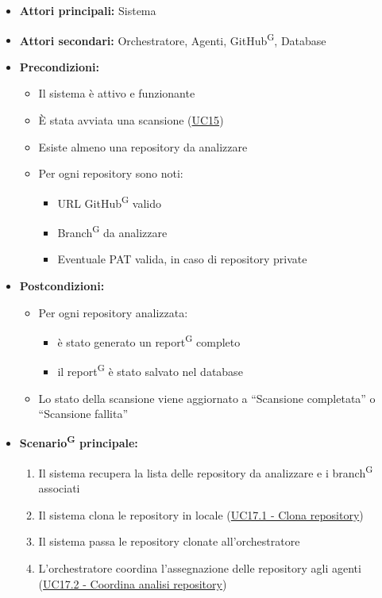 \documentclass[a4paper, 11pt]{article}
\begin{document}
\begin{itemize}
	\item \textbf{Attori principali:} Sistema
	\item \textbf{Attori secondari:} Orchestratore, Agenti, GitHub\textsuperscript{G}, Database
	\item \textbf{Precondizioni:}
	\begin{itemize}
		\item Il sistema è attivo e funzionante
		\item È stata avviata una scansione (\hyperref[UC15]{UC15})
		\item Esiste almeno una repository da analizzare
		\item Per ogni repository sono noti:
		\begin{itemize}
			\item URL GitHub\textsuperscript{G} valido
			\item Branch\textsuperscript{G} da analizzare
			\item Eventuale PAT valida, in caso di repository private
		\end{itemize}
	\end{itemize}
	\item \textbf{Postcondizioni:}
	\begin{itemize}
		\item Per ogni repository analizzata:
		\begin{itemize}
			\item è stato generato un report\textsuperscript{G} completo
			\item il report\textsuperscript{G} è stato salvato nel database
		\end{itemize}
		\item Lo stato della scansione viene aggiornato a “Scansione completata” o “Scansione fallita”
	\end{itemize}
	\item \textbf{Scenario\textsuperscript{G} principale:}
	\begin{enumerate}
		\item Il sistema recupera la lista delle repository da analizzare e i branch\textsuperscript{G} associati
		\item Il sistema clona le repository in locale (\hyperref[UC17.1]{UC17.1 - Clona repository})
		\item Il sistema passa le repository clonate all'orchestratore
		\item L'orchestratore coordina l'assegnazione delle repository agli agenti (\hyperref[UC17.2]{UC17.2 - Coordina analisi repository})

\end{enumerate}
\end{itemize}
\end{document}
